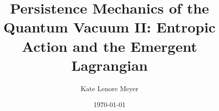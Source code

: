 \documentclass[aps,prd,twocolumn,showpacs,superscriptaddress,groupedaddress,nofootinbib,english]{revtex4-2}
\begin{document}
\title{Persistence Mechanics of the Quantum Vacuum II: Entropic Action and the Emergent Lagrangian}

\author{Kate Lenore Meyer}

\date{\today}



\maketitle %
















\appendix


\end{document}
